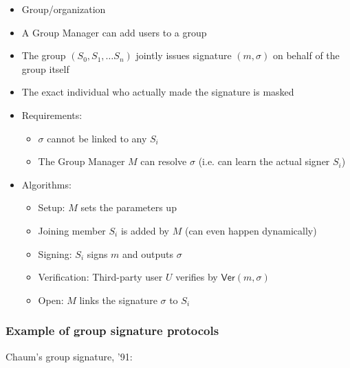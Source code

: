\documentclass[11pt]{article}
\theoremstyle{definition}
\theoremstyle{proof}
\newcommand{\Ver}{\mathsf{Ver}}
\begin{document}
\begin{itemize}
	\item Group/organization
	\item A Group Manager can add users to a group
	\item The group $(S_0, S_1, \dots S_n)$ jointly issues signature $(m, \sigma)$ on behalf of the group itself
	\item The exact individual who actually made the signature is masked
	\item Requirements:
	\begin{itemize}
		\item $\sigma$ cannot be linked to any $S_i$
		\item The Group Manager $M$ can resolve $\sigma$ (i.e. can learn the actual signer $S_i$)
	\end{itemize}
	\item Algorithms:
	\begin{itemize}
		\item Setup: $M$ sets the parameters up
		\item Joining member $S_i$ is added by $M$ (can even happen dynamically)
		\item Signing: $S_i$ signs $m$ and outputs $\sigma$
		\item Verification: Third-party user $U$ verifies by $\Ver(m, \sigma)$
		\item Open: $M$ links the signature $\sigma$ to $S_i$
	\end{itemize}
\end{itemize}

\subsubsection{Example of group signature protocols}

Chaum's group signature, '91:
\end{document}

